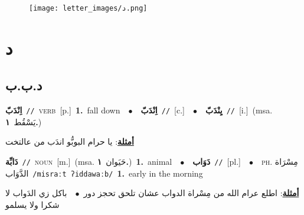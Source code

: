 \documentclass[10pt,a4paper,twoside]{article} %
\begin{document}
\begin{figure*}[t!]\centering\texttt{[image: letter\_images/د.png]}\end{figure*}
\color{white}

 \section*{\foreignlanguage{arabic}{د}} 
 \begin{multicols}{2} 

%
\color{black}
\vspace{-3mm}
\subsection*{\color{blue}\foreignlanguage{arabic}{د.ب.ب}\color{blue}{}} 

{\setlength\topsep{0pt}\textbf{\foreignlanguage{arabic}{اِنْدَبّ}}\ {\color{gray}\texttt{//}\color{black}}\ \textsc{verb}\ [p.]\ \textbf{1.}~fall down\ \ $\bullet$\ \ \setlength\topsep{0pt}\textbf{\foreignlanguage{arabic}{اِنْدَبّ}}\ {\color{gray}\texttt{//}\color{black}}\ [c.]\ \ $\bullet$\ \ \setlength\topsep{0pt}\textbf{\foreignlanguage{arabic}{يِنْدَبّ}}\ {\color{gray}\texttt{//}\color{black}}\ [i.]\ \color{gray}(msa. \foreignlanguage{arabic}{يَسْقُط}~\foreignlanguage{arabic}{\textbf{١.}})\color{black}\  \begin{flushright}\color{gray}\foreignlanguage{arabic}{\textbf{\underline{\foreignlanguage{arabic}{أمثلة}}}: يا حرام البوبُّو اندَب من عالتخت}\end{flushright}\color{black}} \vspace{2mm}

{\setlength\topsep{0pt}\textbf{\foreignlanguage{arabic}{دَابِّة}}\ {\color{gray}\texttt{//}\color{black}}\ \textsc{noun}\ [m.]\ \color{gray}(msa. \foreignlanguage{arabic}{حَيَوان}~\foreignlanguage{arabic}{\textbf{١.}})\color{black}\ \textbf{1.}~animal\ \ $\bullet$\ \ \setlength\topsep{0pt}\textbf{\foreignlanguage{arabic}{دَوَاب}}\ {\color{gray}\texttt{//}\color{black}}\ [pl.]\ \ $\bullet$\ \ \textsc{ph.} \color{gray} \foreignlanguage{arabic}{مِسْرَاة الدَّوَاب}\color{black}\ {\color{gray}\texttt{/{\sffamily misraːt ʔiddawaːb}/}\color{black}}\ \textbf{1.}~early in the morning\  \begin{flushright}\color{gray}\foreignlanguage{arabic}{\textbf{\underline{\foreignlanguage{arabic}{أمثلة}}}: اطلع عرام الله من مِسْراة الدواب عشان تلحق تحجز دور\ $\bullet$\ \  باكل زي الدَواب لا شكرا ولا يسلمو}\end{flushright}\color{black}} \vspace{2mm}


\end{multicols}
\end{document}
